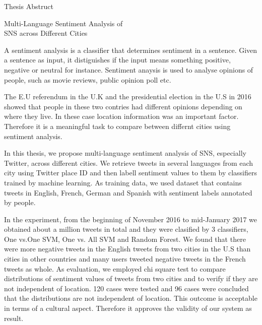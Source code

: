 \newpage

\thispagestyle{empty}
\vspace*{2.0cm}

\begin{center}
\LARGE{Thesis Abstruct}
\end{center}
\vspace{3mm}

\begin{center}
\LARGE{Multi-Language Sentiment Analysis of\\SNS across Different Cities}
\end{center}

\vspace{20mm}
\setlength\parindent{2zw}
A sentiment analysis is a classifier that determines sentiment in a sentence.
Given a sentence as input, it distiguishes if the input means something positive, negative or neutral for instance.
Sentiment anaysis is used to analyse opinions of people, such as movie reviews, public opinion poll etc.

The E.U referendum in the U.K and the presidential election in the U.S in 2016 showed that people in these two contries had different opinions depending on where they live.
In these case location information was an important factor.
Therefore it is a meaningful task to compare between differnt cities using sentiment analysis.

In this thesis, we propose multi-language sentiment analysis of SNS, especially Twitter, across different cities.
We retrieve tweets in several languages from each city using Twitter place ID and then labell sentiment values to them by classifiers trained by machine learning.
As training data, we used dataset that contains tweets in English, French, German and Spanish with sentiment labels annotated by people. 

In the experiment, from the beginning of November 2016 to mid-January 2017 we obtained about a million tweets in total and they were clasified by 3 classifiers, One vs.One SVM, One vs. All SVM and Random Forest.
We found that there were more negative tweets in the English tweets from two cities in the U.S than cities in other countries and many users tweeted negative tweets in the French tweets as whole. 
As evaluation, we employed chi square test to compare distributions of sentiment values of tweets from two cities and to verify if they are not independent of location.
120 cases were tested and 96 cases were concluded that the distributions are not independent of location.
This outcome is acceptable in terms of a cultural aspect.
Therefore it approves the validity of our system as result.

